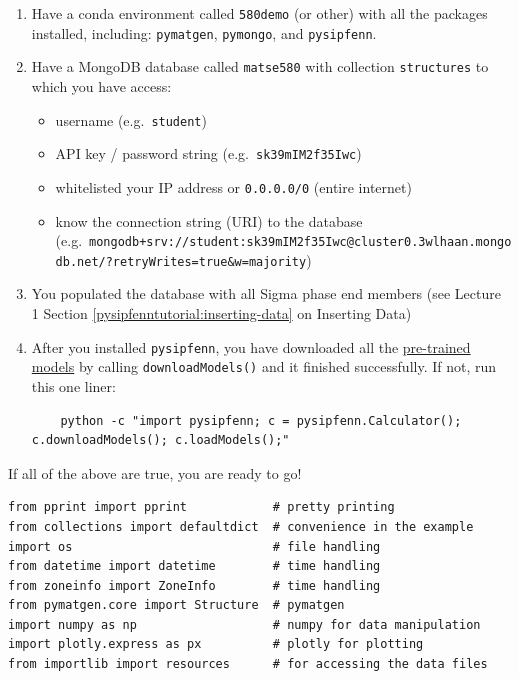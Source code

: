 \begin{enumerate}
    \item Have a conda environment called \texttt{580demo} (or other) with all the packages installed, including: \texttt{pymatgen}, \texttt{pymongo}, and \texttt{pysipfenn}.

    \item Have a MongoDB database called \texttt{matse580} with collection \texttt{structures} to which you have access:
    \begin{itemize}
      \item
        username (e.g.~\texttt{student})
      \item
        API key / password string
        (e.g.~\texttt{sk39mIM2f35Iwc})
      \item
        whitelisted your IP address or \texttt{0.0.0.0/0}
        (entire internet)
      \item
        know the connection string (URI) to the database
        (e.g.~\texttt{mongodb+srv://student:sk39mIM2f35Iwc@cluster0.3wlhaan.mongodb.net/?retryWrites=true\&w=majority})
    \end{itemize}

    \item You populated the database with all Sigma phase end members (see Lecture 1 Section \ref{pysipfenntutorial:inserting-data} on Inserting Data)

    \item After you installed \texttt{pysipfenn}, you have downloaded all the \href{https://zenodo.org/records/7373089}{pre-trained models} by calling \texttt{downloadModels()} and it finished successfully. If not, run this one liner:
    \begin{verbatim}
    python -c "import pysipfenn; c = pysipfenn.Calculator(); c.downloadModels(); c.loadModels();"
    \end{verbatim}
\end{enumerate}


If all of the above are true, you are ready to go!

\begin{verbatim}
from pprint import pprint            # pretty printing
from collections import defaultdict  # convenience in the example
import os                            # file handling
from datetime import datetime        # time handling
from zoneinfo import ZoneInfo        # time handling
from pymatgen.core import Structure  # pymatgen
import numpy as np                   # numpy for data manipulation
import plotly.express as px          # plotly for plotting
from importlib import resources      # for accessing the data files
\end{verbatim}

